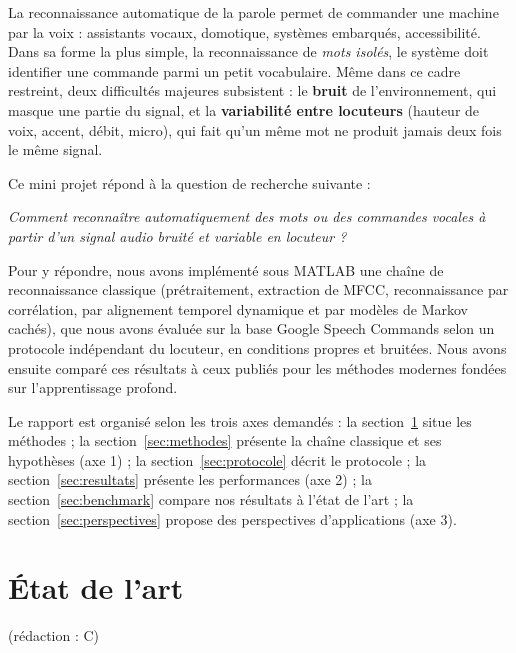 \documentclass[11pt,a4paper]{article}
\newcommand{\redaction}[1]{\hfill{\small\color{gray}(rédaction : #1)}}   %
\begin{document}
La reconnaissance automatique de la parole permet de commander une machine par la voix : assistants vocaux, domotique, systèmes embarqués, accessibilité. Dans sa forme la plus simple, la reconnaissance de \emph{mots isolés}, le système doit identifier une commande parmi un petit vocabulaire. Même dans ce cadre restreint, deux difficultés majeures subsistent : le \textbf{bruit} de l'environnement, qui masque une partie du signal, et la \textbf{variabilité entre locuteurs} (hauteur de voix, accent, débit, micro), qui fait qu'un même mot ne produit jamais deux fois le même signal.

Ce mini projet répond à la question de recherche suivante :
\begin{center}
\emph{Comment reconnaître automatiquement des mots ou des commandes vocales à partir d'un signal audio bruité et variable en locuteur ?}
\end{center}

Pour y répondre, nous avons implémenté sous MATLAB une chaîne de reconnaissance classique (prétraitement, extraction de MFCC, reconnaissance par corrélation, par alignement temporel dynamique et par modèles de Markov cachés), que nous avons évaluée sur la base Google Speech Commands selon un protocole indépendant du locuteur, en conditions propres et bruitées. Nous avons ensuite comparé ces résultats à ceux publiés pour les méthodes modernes fondées sur l'apprentissage profond.

Le rapport est organisé selon les trois axes demandés : la section~\ref{sec:etat} situe les méthodes ; la section~\ref{sec:methodes} présente la chaîne classique et ses hypothèses (axe 1) ; la section~\ref{sec:protocole} décrit le protocole ; la section~\ref{sec:resultats} présente les performances (axe 2) ; la section~\ref{sec:benchmark} compare nos résultats à l'état de l'art ; la section~\ref{sec:perspectives} propose des perspectives d'applications (axe 3).

\section{État de l'art}\label{sec:etat}\redaction{C}
\end{document}
